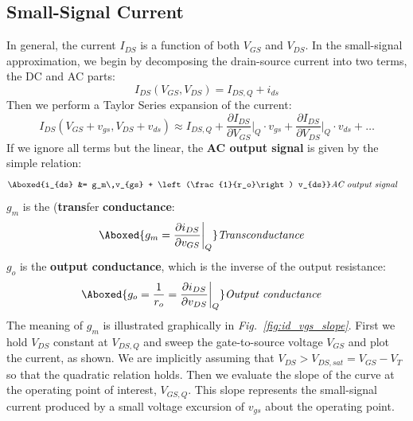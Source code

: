 \subsection{Small-Signal Current}
In general, the current $I_{DS}$ is a function of both $V_{GS}$ and $V_{DS}$.  In the small-signal approximation, we begin by decomposing the drain-source current into two terms, the DC and AC parts:
    \begin{equation}
        I_{DS}(V_{GS},V_{DS}) = {I_{DS,Q}} + {i_{ds}}
    \end{equation}
Then we perform a Taylor Series expansion of the current:
    \begin{equation}
        I_{DS}(V_{GS} + v_{gs},V_{DS} + v_{ds})
        \approx I_{DS,Q} + \frac{\partial{I_{DS}}}{\partial{V_{GS}}} \bigg\rvert_Q \cdot v_{gs}
                + \frac{\partial{I_{DS}}}{\partial{V_{DS}}} \bigg\rvert_Q \cdot v_{ds} + \dots
    \end{equation}
If we ignore all terms but the linear, the \textbf{AC output signal} is given by the simple relation:
    \begin{align}
        \Aboxed{i_{ds} &= g_m\,v_{gs} + \left(\frac{1}{r_o}\right) v_{ds}} &\textit{AC output signal}
    \end{align}
$g_m$ is the (\textbf{trans}fer \textbf{conductance}:
    \begin{align}
        \Aboxed{g_m = \frac{\partial{i_{DS}}}{\partial{v_{GS}}} \bigg\rvert_Q} &\textit{Transconductance}
    \end{align}
$g_o$ is the \textbf{output conductance}, which is the inverse of the output resistance:
    \begin{align}
        \Aboxed{g_o = \frac{1}{r_o} = \frac{\partial{i_{DS}}}{\partial{v_{DS}}}\bigg\rvert_Q} &\textit{Output conductance}
    \end{align}
The meaning of $g_m$ is illustrated graphically in \emph{Fig.~\ref{fig:id_vgs_slope}}.  First we hold $V_{DS}$ constant at $V_{DS,Q}$ and sweep the gate-to-source voltage $V_{GS}$ and plot the current, as shown.   We are implicitly assuming that  $V_{DS} > V_{DS,sat} = V_{GS} - V_T$ so that the quadratic relation holds.  Then we evaluate the slope of the curve at the operating point of interest, $V_{GS,Q}$.  This slope represents the small-signal current produced by a small voltage excursion of $v_{gs}$ about the operating point.
\newpage
